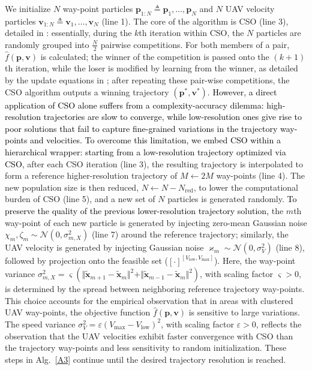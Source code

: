 \documentclass[10pt, twocolumn]{IEEEtran}
\theoremstyle{plain}
\theoremstyle{definition}
\theoremstyle{remark}
\newcommand\hlt[1]{\textcolor{black}{#1}}
\begin{document}
We initialize $N$ way-point particles $\mathbf{p}_{1:N}{\triangleq}\mathbf{p}_{1},{\dots},\mathbf{p}_{N}$ and $N$ UAV velocity particles $\mathbf{v}_{1:N}\triangleq\mathbf{v}_{1},\dots,\mathbf{v}_{N}$ (line 1). The core of the algorithm is CSO (line 3), detailed in \cite{CSO}: essentially, during the $k$th iteration within CSO, the  $N$ particles are randomly grouped into $\frac{N}{2}$ pairwise competitions. For both members of a pair, $\hat{f}(\mathbf{p},\mathbf{v})$ is calculated; the winner of the competition is passed onto the $(k{+}1)$th iteration, while the loser is modified by learning from the winner, as detailed by the update equations in \cite{CSO};
after repeating these pair-wise competitions, the CSO algorithm outputs a winning trajectory $(\mathbf{p}^*,\mathbf{v}^*)$. \label{dilemma}\hlt{However, a direct application of CSO alone suffers from a complexity-accuracy dilemma: high-resolution trajectories are slow to converge, while low-resolution ones give rise to poor solutions that fail to capture fine-grained variations in the trajectory way-points and velocities. To overcome this limitation, we embed CSO  within a hierarchical wrapper: starting from a low-resolution trajectory optimized via CSO,}
after each CSO iteration (line 3), the resulting trajectory is interpolated to form a reference higher-resolution trajectory of $M{\gets}2M$ way-points (line 4). The new population size is then reduced, $N{\gets}N{-}N_{\mathrm{red}}$, to lower the computational burden of CSO (line 5), and a new set of $N$ particles is generated randomly. \hlt{To preserve the quality of the previous lower-resolution trajectory solution,} the $m$th way-point of each new particle is generated by injecting zero-mean Gaussian noise $\chi_{m},\zeta_{m}{\sim}\mathcal{N}\left(0,\sigma_{m,X}^2\right)$ (line 7) around the reference trajectory; similarly, the UAV velocity is
generated by injecting Gaussian noise $\varkappa_{m}{\sim}\mathcal{N}(0,\sigma_V^2)$ (line 8), followed by projection onto the feasible set ($[\cdot]^{[V_{\mathrm{low}},V_{\mathrm{max}}]}$). Here, the way-point variance  $\sigma_{m,X}^2=\varsigma(\Vert\tilde{\mathbf{x}}_{m{+}1}{-}\tilde{\mathbf{x}}_{m}\Vert^{2}{+}\Vert\tilde{\mathbf{x}}_{m{-}1}{-}\tilde{\mathbf{x}}_{m}\Vert^2)$, with scaling factor $\varsigma{>}0$, is determined by the spread between neighboring reference trajectory way-points. This choice accounts for the empirical observation that in areas with clustered UAV way-points, the objective function $\hat{f}(\mathbf{p},\mathbf{v})$ is sensitive to large variations. The speed variance $\sigma_V^2=\varepsilon(V_{\mathrm{max}}{-}V_{\mathrm{low}})^{2}$, with scaling factor $\varepsilon{>}0$, reflects the observation that the UAV velocities exhibit faster convergence with CSO than the trajectory way-points and less sensitivity to random initialization. These steps in Alg.~\ref{A3} continue until the desired trajectory resolution is reached. 
\end{document}
